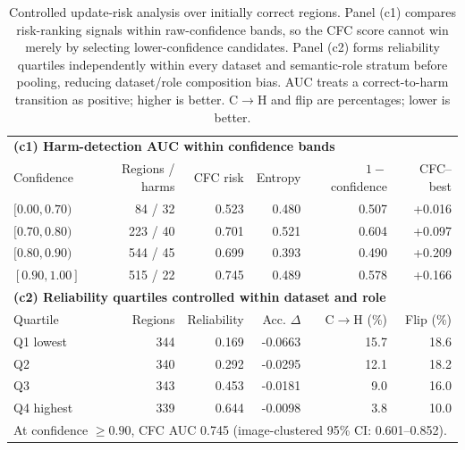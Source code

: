 \begin{table}[t]
\centering
\small
\caption{Controlled update-risk analysis over initially correct regions. Panel (c1) compares risk-ranking signals within raw-confidence bands, so the CFC score cannot win merely by selecting lower-confidence candidates. Panel (c2) forms reliability quartiles independently within every dataset and semantic-role stratum before pooling, reducing dataset/role composition bias. AUC treats a correct-to-harm transition as positive; higher is better. C$\rightarrow$H and flip are percentages; lower is better.}
\label{tab:source-risk-expanded}
\begin{tabular}{lrrrrr}
\toprule
\multicolumn{6}{l}{\textbf{(c1) Harm-detection AUC within confidence bands}}\\
Confidence & Regions / harms & CFC risk & Entropy & $1-$confidence & CFC--best \\
\midrule
$[0.00,0.70)$ & 84 / 32 & 0.523 & 0.480 & 0.507 & +0.016 \\
$[0.70,0.80)$ & 223 / 40 & 0.701 & 0.521 & 0.604 & +0.097 \\
$[0.80,0.90)$ & 544 / 45 & 0.699 & 0.393 & 0.490 & +0.209 \\
$[0.90,1.00]$ & 515 / 22 & 0.745 & 0.489 & 0.578 & +0.166 \\
\midrule
\multicolumn{6}{l}{\textbf{(c2) Reliability quartiles controlled within dataset and role}}\\
Quartile & Regions & Reliability & Acc. $\Delta$ & C$\rightarrow$H (\%) & Flip (\%) \\
\midrule
Q1 lowest & 344 & 0.169 & -0.0663 & 15.7 & 18.6 \\
Q2 & 340 & 0.292 & -0.0295 & 12.1 & 18.2 \\
Q3 & 343 & 0.453 & -0.0181 & 9.0 & 16.0 \\
Q4 highest & 339 & 0.644 & -0.0098 & 3.8 & 10.0 \\
\midrule
\multicolumn{6}{l}{\footnotesize At confidence $\geq0.90$, CFC AUC 0.745 (image-clustered 95\% CI: 0.601--0.852).}\\
\bottomrule
\end{tabular}
\end{table}
